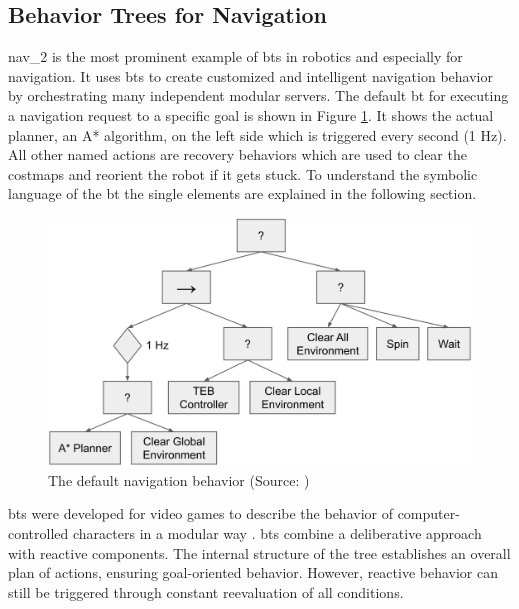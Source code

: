 \subsection{Behavior Trees for Navigation}

\gls{nav_2} is the most prominent example of \glspl{bt} in robotics and especially for navigation. It uses \glspl{bt} to create customized and intelligent navigation behavior by orchestrating many independent modular servers. The default \gls{bt} for executing a navigation request to a specific goal is shown in Figure \ref{fig:nav2_bt}. It shows the actual planner, an A* algorithm, on the left side which is triggered every second (1 Hz). All other named actions are recovery behaviors which are used to clear the costmaps and reorient the robot if it gets stuck. To understand the symbolic language of the \gls{bt} the single elements are explained in the following section.

\begin{figure}[h]
    \centering
    \includegraphics[width=\textwidth]{figures/20_state_of_the_art/nav2_bt.png}
    \caption[The default navigation behavior]{The default navigation behavior (Source: \cite{macenski_marathon_2020})}
    \label{fig:nav2_bt}
\end{figure}

\Glspl{bt} were developed for video games to describe the behavior of computer-controlled characters in a modular way \cite{hutchison_evolving_2010}. \Glspl{bt} combine a deliberative approach with reactive components. The internal structure of the tree establishes an overall plan of actions, ensuring goal-oriented behavior. However, reactive behavior can still be triggered through constant reevaluation of all conditions. 

